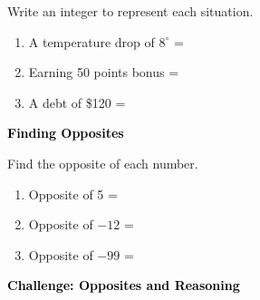\documentclass[12pt, letterpaper, fleqn]{article}
\newcommand{\blank}{\underline{\hspace{2.2cm}}}
\begin{document}
\noindent
Write an integer to represent each situation.

\vspace{3mm}
\begin{enumerate}[itemsep=2.2cm, leftmargin=0.6cm]
\item A temperature drop of $8^\circ$ = \blank

\vspace{2cm}

\item Earning 50 points bonus = \blank

\vspace{2cm}

\item A debt of \$120 = \blank

\vspace{2cm}

\end{enumerate}

\newpage

\begin{tcolorbox}[colback=black!10]
\large\textcolor{black}{\textbf{Finding Opposites}}
\end{tcolorbox}

\noindent
Find the opposite of each number.

\vspace{3mm}
\begin{enumerate}[itemsep=2.3cm, leftmargin=0.6cm]
\item Opposite of 5 = \blank

\vspace{2.2cm}

\item Opposite of $-12$ = \blank

\vspace{2.2cm}

\item Opposite of $-99$ = \blank

\vspace{2.2cm}

\end{enumerate}

\newpage

\begin{tcolorbox}[colback=black!10]
\large\textcolor{black}{\textbf{Challenge: Opposites and Reasoning}}
\end{tcolorbox}
\end{document}
